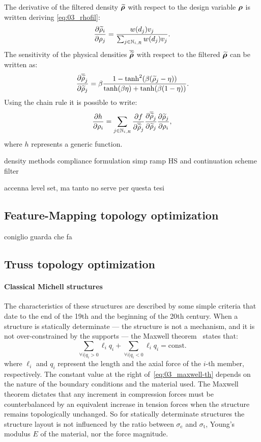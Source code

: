 The derivative of the filtered density $\bm{\widetilde{\rho}}$ with respect to the design variable $\bm{\rho}$ is written deriving \eqref{eq:03_rhofil}:
\begin{equation}
    \frac{\partial\widetilde{\rho}_i}{\partial\rho_j} = \frac{w(d_j)v_j}{\sum_{j \in \mathbb{N}_{i,R}} w(d_j)v_j}.
    \label{eq:03_sens_filt}
\end{equation}
The sensitivity of the physical densities $\bm{\overline{\widetilde{\rho}}}$ with respect to the filtered $\bm{\widetilde{\rho}}$ can be written as:
\begin{equation}
    \frac{\partial\overline{\widetilde{\rho}}_j}{\partial\widetilde{\rho}_j} = \beta \frac{1-\tanh^2(\beta(\widetilde{\rho}_j-\eta))}{\tanh(\beta\eta)+\tanh(\beta(1 - \eta))}.
    \label{eq:03_sens_proj}
\end{equation}
Using the chain rule it is possible to write:
\begin{equation}
    \label{eq:03_chain}
    \frac{\partial h}{\partial\rho_i} = \sum_{j \in \mathbb{N}_{i,R}} \frac{\partial f}{\partial\overline{\widetilde{\rho}}_j} \frac{\partial\overline{\widetilde{\rho}}_j}{\partial\widetilde{\rho}_j} \frac{\partial\widetilde{\rho}_j}{\partial\rho_i},
\end{equation}
where $h$ represents a generic function.

density methods
compliance formulation
simp ramp HS and continuation scheme
filter

accenna level set, ma tanto no serve per questa tesi

\subsection{Feature-Mapping topology optimization}
coniglio guarda che fa

\subsection{Truss topology optimization}
\paragraph{Classical Michell structures} \label{sec:03_michell}
The characteristics of these structures are described by some simple criteria that date to the end of the 19th and the beginning of the 20th century. When a structure is statically determinate — \ie the structure is not a mechanism, and it is not over-constrained by the supports — the Maxwell theorem~ states that:
\begin{equation} \label{eq:03_maxwell-th}
    \sum_{\forall i | q_i>0}\ell_iq_i + \sum_{\forall i | q_i<0}\ell_iq_i = \textrm{const.}
\end{equation}
where $\ell_i$ and $q_i$ represent the length and the axial force of the $i$-th member, respectively. The constant value at the right of~\eqref{eq:03_maxwell-th} depends on the nature of the boundary conditions and the material used. The Maxwell theorem dictates that any increment in compression forces must be counterbalanced by an equivalent increase in tension forces when the structure remains topologically unchanged. So for statically determinate structures the structure layout is not influenced by the ratio between $\sigma_\text{c}$ and $\sigma_\text{t}$, Young's modulus $E$ of the material, nor the force magnitude.

